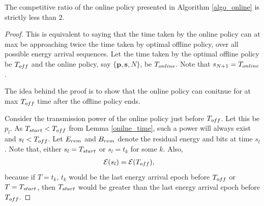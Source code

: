 \begin{theorem}
The competitive ratio of the online policy presented in Algorithm \ref{algo_online} is strictly less than 2.
\end{theorem}
\begin{proof}
This is equivalent to saying that the time taken by the online policy can at max be approaching twice the time taken by optimal offline policy, over all possible energy arrival sequences. Let the time taken by the optimal offline policy be $T_{\mbox{\scriptsize{off}}}$ and the online policy, say $\{\bm{{p}},\bm{{s}},{N}\}$, be $T_{\mbox{\scriptsize{online}}}$. Note that $s_{N+1}=T_{\mbox{\scriptsize{online}}}$. 

The idea behind the proof is to show that the online policy can conitnue for at max $T_{\mbox{\scriptsize{off}}}$ time  after the offline policy ends.
%

Consider the transmission power of the online policy just before $T_{\mbox{\scriptsize{off}}}$. Let this be ${p}_l$. As $T_{\mbox{\scriptsize{start}}}<T_{\mbox{\scriptsize{off}}}$ from Lemma \ref{onilne_time}, such a power will always exist and $s_l<T_{\mbox{\scriptsize{off}}}$. Let $E_{\mbox{\scriptsize{rem}}}$ and $B_{\mbox{\scriptsize{rem}}}$ denote the residual energy and bits at time ${s}_{l}$. Note that, either ${s}_{l}=T_{\mbox{\scriptsize{start}}}$ or ${s}_{l}=t_k$ for some $k$. Also, 
\begin{align}
&\ETx({s}_{l})=\ETx(T_{\mbox{\scriptsize{off}}}),
\label{eq_online_time_0}
\end{align}
because if $T=t_k$, $t_k$ would be the last energy arrival epoch before $T_{\mbox{\scriptsize{off}}}$ or $T=T_{\mbox{\scriptsize{start}}}$, then $T_{\mbox{\scriptsize{start}}}$ would be greater than the last energy arrival epoch before $T_{\mbox{\scriptsize{off}}}$. 


\end{proof}
